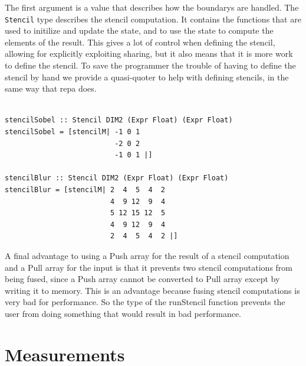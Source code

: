 \documentclass[preprint]{sigplanconf}
\begin{document}
The first argument is a value that describes how the boundarys are
handled. The \texttt{Stencil} type describes the stencil computation. It
contains the functions that are used to initilize and update the state,
and to use the state to compute the elements of the result. This gives a
lot of control when defining the stencil, allowing for explicitly
exploiting sharing, but it also means that it is more work to define the
stencil. To save the programmer the trouble of having to define the
stencil by hand we provide a quasi-quoter to help with defining
stencils, in the same way that repa does.

\begin{verbatim}

stencilSobel :: Stencil DIM2 (Expr Float) (Expr Float)
stencilSobel = [stencilM| -1 0 1
                          -2 0 2
                          -1 0 1 |]

stencilBlur :: Stencil DIM2 (Expr Float) (Expr Float)
stencilBlur = [stencilM| 2  4  5  4  2
                         4  9 12  9  4
                         5 12 15 12  5
                         4  9 12  9  4
                         2  4  5  4  2 |]
\end{verbatim}

A final advantage to using a Push array for the result of a stencil
computation and a Pull array for the input is that it prevents two
stencil computations from being fused, since a Push array cannot be
converted to Pull array except by writing it to memory. This is an
advantage because fusing stencil computations is very bad for
performance. So the type of the runStencil function prevents the user
from doing something that would result in bad performance.

\section{Measurements}

\label{sec:benchmarks}
\end{document}
